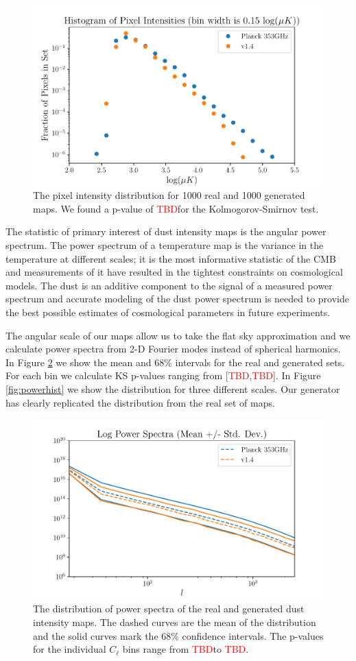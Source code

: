 \documentclass[twocolumn]{aastex62}
\def\tbd{\textcolor{red}{TBD}}
\begin{document}
\begin{figure}
\includegraphics[width = .5\textwidth]{HistPixIntensity.pdf}
\caption{The pixel intensity distribution for 1000 real and 1000 generated maps. We found a p-value of \tbd for the Kolmogorov-Smirnov test.}
\label{fig:pix_int}
\end{figure}

The statistic of primary interest of dust intensity maps is the angular power spectrum. The power spectrum of a temperature map is the variance in the temperature at different scales; it is the most informative statistic of the CMB and measurements of it have resulted in the tightest constraints on cosmological models. The  dust is an additive  component to the signal of a measured power spectrum and accurate modeling of the dust power spectrum is needed to provide the best possible estimates of cosmological parameters in future experiments. 

The angular scale of our maps allow us to take the flat sky approximation and we calculate power spectra from 2-D Fourier modes instead of spherical harmonics. In Figure \ref{fig:power} we show the mean and 68\% intervals for the real and generated sets. For  each bin we calculate KS p-values ranging from [\tbd,\tbd]. In Figure \ref{fig:powerhist} we show the distribution for three different  scales. Our generator has clearly replicated the distribution from the real set of maps.

\begin{figure}
\includegraphics[width = .5\textwidth]{LogPowerSpectra.pdf}
\caption{The distribution of power spectra of the real and generated dust intensity maps. The dashed curves are the mean of the distribution and the solid curves mark the 68\% confidence intervals. The p-values for the individual $C_{\ell}$ bins range from \tbd to \tbd. }
\label{fig:power}
\end{figure}
\end{document}
